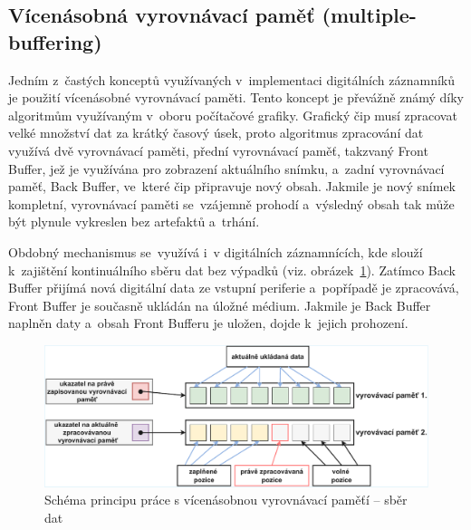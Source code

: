 \subsection{Vícenásobná vyrovnávací paměť (multiple-buffering)}
\label{vicenasobna_vyrovnavaci_pamet}
Jedním z~častých konceptů využívaných v~implementaci digitálních záznamníků je použití vícenásobné vyrovnávací paměti. Tento koncept je převážně známý díky algoritmům využívaným v~oboru počítačové grafiky. Grafický čip musí zpracovat velké množství dat za krátký časový úsek, proto algoritmus zpracování dat využívá dvě vyrovnávací paměti, přední vyrovnávací paměť, takzvaný Front Buffer, jež je využívána pro zobrazení aktuálního snímku, a~zadní vyrovnávací paměť, Back Buffer, ve~které čip připravuje nový obsah. Jakmile je nový snímek kompletní, vyrovnávací paměti se~vzájemně prohodí a~výsledný obsah tak může být plynule vykreslen bez artefaktů a~trhání.~\cite{multiple_buffering_batch_saving, double_buffering_model}

Obdobný mechanismus se~využívá i~v digitálních záznamnících, kde slouží k~zajištění kontinuálního sběru dat bez výpadků (viz. obrázek~\ref{fig:multiple-buffering-1}). Zatímco Back Buffer přijímá nová digitální data ze vstupní periferie a~popřípadě je zpracovává, Front Buffer je současně ukládán na úložné médium. Jakmile je Back Buffer naplněn daty a~obsah Front Bufferu je uložen, dojde k~jejich prohození.~\cite{multiple_buffering_batch_saving, double_buffering_model}

\begin{figure}[h]
    \centering
    \includegraphics[width=1.00\textwidth]{obrazky-figures/multiple_buffering-1-1.pdf}
    
    \caption{Schéma principu práce s vícenásobnou vyrovnávací paměťí -- sběr dat}
    \label{fig:multiple-buffering-1}
\end{figure}


